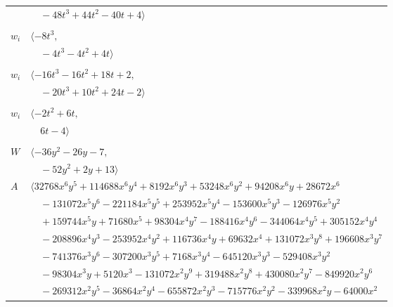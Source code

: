 \documentclass[11pt]{article}
\begin{document}
\begin{longtable}{@{}ll@{}}
 & $\quad -48t^{3}+44t^{2}-40t+4\rangle$\\
\addlinespace[2pt]
\multicolumn{2}{@{}p{0.97\textwidth}@{}}{$i=40$, $D_i=2$, $\rho_{ij}$: $10{:}2, \allowbreak 20{:}1, \allowbreak 25{:}1, \allowbreak 41{:}2$}\\
$w_i$ & $\langle -8t^{3},$\\
 & $\quad -4t^{3}-4t^{2}+4t\rangle$\\
\addlinespace[2pt]
\multicolumn{2}{@{}p{0.97\textwidth}@{}}{$i=41$, $D_i=2$, $\rho_{ij}$: $0{:}1, \allowbreak 1{:}2, \allowbreak 5{:}1, \allowbreak 27{:}2, \allowbreak 30{:}2, \allowbreak 40{:}1, \allowbreak 44{:}2$}\\
$w_i$ & $\langle -16t^{3}-16t^{2}+18t+2,$\\
 & $\quad -20t^{3}+10t^{2}+24t-2\rangle$\\
\addlinespace[2pt]
\multicolumn{2}{@{}p{0.97\textwidth}@{}}{$i=42$, $D_i=1$, $\rho_{ij}$: $1{:}1, \allowbreak 11{:}1, \allowbreak 23{:}2, \allowbreak 43{:}1, \allowbreak 44{:}1$}\\
$w_i$ & $\langle -2t^{2}+6t,$\\
 & $\quad 6t-4\rangle$\\
\addlinespace[2pt]
\multicolumn{2}{@{}p{0.97\textwidth}@{}}{$i=43$, $D_i=16$, $\rho_{ij}$: $1{:}1, \allowbreak 2{:}1, \allowbreak 3{:}1, \allowbreak 6{:}1, \allowbreak 9{:}1, \allowbreak 16{:}1, \allowbreak 18{:}2, \allowbreak 23{:}1, \allowbreak 34{:}2, \allowbreak 42{:}2$}\\
$W$ & $\langle -36y^{2}-26y-7,$\\
 & $\quad -52y^{2}+2y+13\rangle$\\
$A$ & $\langle 32768x^{6}y^{5}+114688x^{6}y^{4}+8192x^{6}y^{3}+53248x^{6}y^{2}+94208x^{6}y+28672x^{6}$\\
 & $\quad -131072x^{5}y^{6}-221184x^{5}y^{5}+253952x^{5}y^{4}-153600x^{5}y^{3}-126976x^{5}y^{2}$\\
 & $\quad +159744x^{5}y+71680x^{5}+98304x^{4}y^{7}-188416x^{4}y^{6}-344064x^{4}y^{5}+305152x^{4}y^{4}$\\
 & $\quad -208896x^{4}y^{3}-253952x^{4}y^{2}+116736x^{4}y+69632x^{4}+131072x^{3}y^{8}+196608x^{3}y^{7}$\\
 & $\quad -741376x^{3}y^{6}-307200x^{3}y^{5}+7168x^{3}y^{4}-645120x^{3}y^{3}-529408x^{3}y^{2}$\\
 & $\quad -98304x^{3}y+5120x^{3}-131072x^{2}y^{9}+319488x^{2}y^{8}+430080x^{2}y^{7}-849920x^{2}y^{6}$\\
 & $\quad -269312x^{2}y^{5}-36864x^{2}y^{4}-655872x^{2}y^{3}-715776x^{2}y^{2}-339968x^{2}y-64000x^{2}$\\

\end{longtable}
\end{document}
